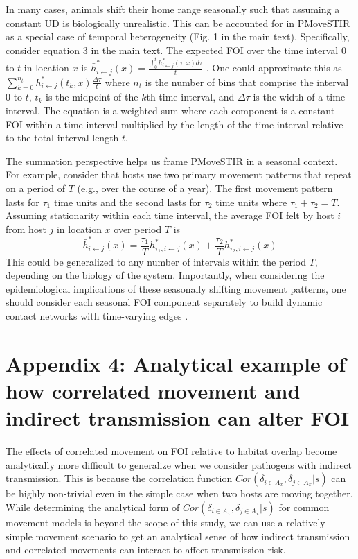 \documentclass[letterpaper]{article}
\begin{document}
In many cases, animals shift their home range seasonally \citep{Viana2018,Richard2014} such that assuming a constant UD is biologically unrealistic. This can be accounted for in PMoveSTIR as a special case of temporal heterogeneity (Fig. 1 in the main text).  Specifically, consider equation 3 in the main text. The expected FOI over the time interval 0 to $t$ in location $x$ is $\bar{h}^*_{i \leftarrow j}(x) = \frac{\int_0^t h^*_{i \leftarrow j}(\tau, x) d\tau}{t}$ \citep{Wilber2022}.  One could approximate this as $\sum_{k = 0}^{n_t} h^*_{i \leftarrow j}(t_k, x) \frac{\Delta \tau}{t}$ where $n_t$ is the number of bins that comprise the interval 0 to $t$, $t_k$ is the midpoint of the $k$th time interval, and $\Delta \tau$ is the width of a time interval.  The equation is a weighted sum where each component is a constant FOI within a time interval multiplied by the length of the time interval relative to the total interval length $t$.  

The summation perspective helps us frame PMoveSTIR in a seasonal context.  For example, consider that hosts use two primary movement patterns that repeat on a period of $T$ (e.g., over the course of a year).  The first movement pattern lasts for $\tau_1$ time units and the second lasts for $\tau_2$ time units where $\tau_1 + \tau_2 = T$.  Assuming stationarity within each time interval, the average FOI felt by host $i$ from host $j$ in location $x$ over period $T$ is 
\begin{equation}
\bar{h}^*_{i \leftarrow j}(x) = \frac{\tau_1}{T} h^*_{\tau_1, i \leftarrow j}(x) + \frac{\tau_2}{T} h^*_{\tau_2, i \leftarrow j}(x)
\label{eq:seasonal}
\end{equation}
This could be generalized to any number of intervals within the period $T$, depending on the biology of the system.  Importantly, when considering the epidemiological implications of these seasonally shifting movement patterns, one should consider each seasonal FOI component separately to build dynamic contact networks with time-varying edges \citep{Wilber2022}.


\section*{Appendix 4: Analytical example of how correlated movement and indirect transmission can alter FOI}

The effects of correlated movement on FOI relative to habitat overlap become analytically more difficult to generalize when we consider pathogens with indirect transmission.  This is because the correlation function $Cor(\delta_{i \in A_x}, \delta_{j \in A_x} | s)$ can be highly non-trivial even in the simple case when two hosts are moving together.  
While determining the analytical form of $Cor(\delta_{i \in A_x}, \delta_{j \in A_x} | s)$ for common movement models is beyond the scope of this study, we can use a relatively simple movement scenario to get an analytical sense of how indirect transmission and correlated movements can interact to affect transmission risk.
\end{document}
